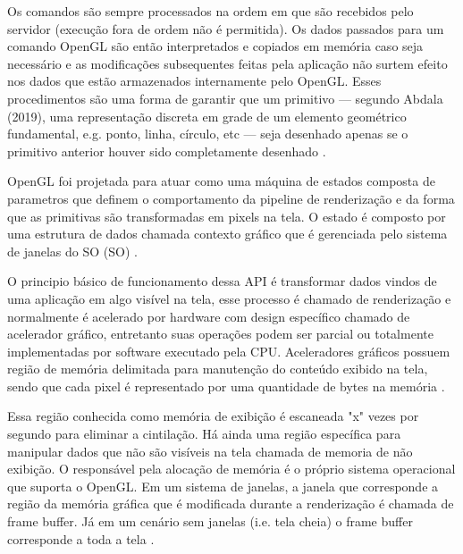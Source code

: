 Os comandos são sempre processados na ordem em que são recebidos pelo servidor (execução fora de ordem não é permitida). Os dados passados para um comando OpenGL são então interpretados e copiados em memória caso seja necessário e as modificações subsequentes feitas pela aplicação não surtem efeito nos dados que estão armazenados internamente pelo OpenGL. Esses procedimentos são uma forma de garantir que um primitivo --- segundo Abdala (2019)\nocite{abdala}, uma representação discreta em grade de um elemento geométrico fundamental, e.g. ponto, linha, círculo, etc --- seja desenhado apenas se o primitivo anterior houver sido completamente desenhado \cite{GLSLBook}.

OpenGL foi projetada para atuar como uma máquina de estados composta de parametros que definem o comportamento da pipeline de renderização e da forma que as primitivas são transformadas em pixels na tela. O estado é composto por uma estrutura de dados chamada contexto gráfico que é gerenciada pelo sistema de janelas do SO (\acrlong{SO}) \cite{GLSLBook}. 

O principio básico de funcionamento dessa API é transformar dados vindos de uma aplicação em algo visível na tela, esse processo é chamado de renderização e normalmente é acelerado por hardware com design específico chamado de acelerador gráfico, entretanto suas operações podem ser parcial ou totalmente implementadas por software executado pela CPU. Aceleradores gráficos possuem região de memória delimitada para manutenção do conteúdo exibido na tela, sendo que cada pixel é representado por uma quantidade de bytes na memória \cite{GLSLBook}.

Essa região conhecida como memória de exibição é escaneada "x" vezes por segundo para eliminar a cintilação. Há ainda uma região específica para manipular dados que não são visíveis na tela chamada de memoria de não exibição. O responsável pela alocação de memória é o próprio sistema operacional que suporta o OpenGL. Em um sistema de janelas, a janela que corresponde a região da memória gráfica que é modificada durante a renderização é chamada de frame buffer. Já em um cenário sem janelas (i.e. tela cheia) o frame buffer corresponde a toda a tela \cite{GLSLBook}.

\begin{figure}[h!]
	\centering
\end{figure}
\nocite{dptbuf}

